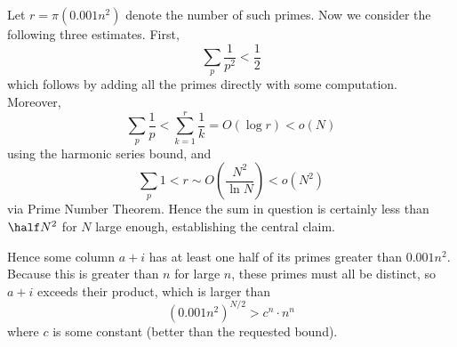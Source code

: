 \documentclass[11pt]{scrartcl}
\begin{document}
Let $r = \pi(0.001n^2)$ denote the number of such primes.
Now we consider the following three estimates.
First, \[ \sum_p \frac{1}{p^2} < \frac 12 \]
which follows by adding all the primes directly with some computation.
Moreover,
\[ \sum_p \frac 1p < \sum_{k=1}^r \frac 1k = O(\log r) < o(N) \]
using the harmonic series bound,
and \[ \sum_p 1 < r \sim O \left( \frac{N^2}{\ln N} \right) < o(N^2) \]
via Prime Number Theorem.
Hence the sum in question is certainly less than $\half N^2$ for $N$ large
enough, establishing the central claim.

Hence some column $a+i$ has at least one
half of its primes greater than $0.001n^2$.
Because this is greater than $n$ for large $n$,
these primes must all be distinct,
so $a+i$ exceeds their product,
which is larger than
\[ \left( 0.001n^2 \right)^{N/2} > c^n \cdot n^n \]
where $c$ is some constant (better than the requested bound).
\pagebreak
\end{document}
